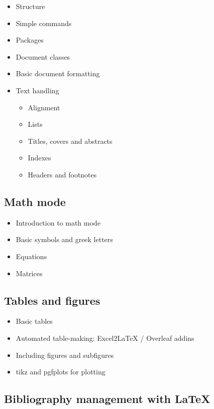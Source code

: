 \documentclass[a4paper,12pt]{article}
\begin{document}
\begin{itemize}
    \item Structure
    \item Simple commands
    \item Packages
    \item Document classes
    \item Basic document formatting
    \item Text handling
    \begin{itemize}
        \item Alignment
        \item Lists
        \item Titles, covers and abstracts
        \item Indexes
        \item Headers and footnotes 
    \end{itemize}
\end{itemize}

\subsection{Math mode}

\begin{itemize}
    \item Introduction to math mode
    \item Basic symbols and greek letters
    \item Equations
    \item Matrices
\end{itemize}

\subsection{Tables and figures}

\begin{itemize}
    \item Basic tables
    \item Automated table-making: Excel2LaTeX / Overleaf addins
    \item Including figures and subfigures
    \item \textsf{tikz} and \textsf{pgfplots} for plotting
    
\end{itemize}

\subsection{Bibliography management with \LaTeX}
\end{document}
